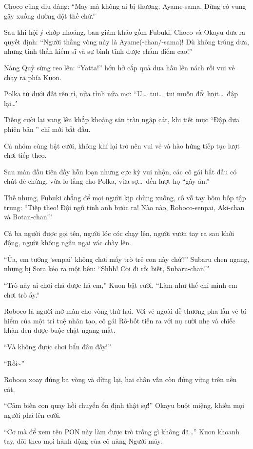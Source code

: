\documentclass[../main.tex]{subfiles}
\begin{document}
Choco cũng dịu dàng: ``May mà không ai bị thương, Ayame-sama. Đừng có vung gậy xuống đường đột thế chứ.''

Sau khi hội ý chớp nhoáng, ban giám khảo gồm Fubuki, Choco và Okayu đưa ra quyết định:
``Người thắng vòng này là Ayame(-chan/-sama)! Dù không trúng dưa, nhưng tinh thần kiếm sĩ và sự bình tĩnh được chấm điểm cao!''

Nàng Quỷ sừng reo lên: ``Yatta!'' hớn hở cắp quả dưa hấu lên nách rồi vui vẻ chạy ra phía Kuon.

Polka từ dưới đất rên rỉ, nửa tỉnh nửa mơ: ``U\dots\ tui\dots\ tui muốn đổi lượt\dots\ đập lại\dots\''

Tiếng cười lại vang lên khắp khoảng sân tràn ngập cát, khi tiết mục ``Đập dưa phiên bản \hll'' chỉ mới bắt đầu.

Cả nhóm cùng bật cười, không khí lại trở nên vui vẻ và hào hứng tiếp tục lượt chơi tiếp theo.

Sau màn đầu tiên đầy hỗn loạn nhưng cực kỳ vui nhộn, các cô gái bắt đầu có chút dè chừng, vừa lo lắng cho Polka, vừa sợ\dots\ đến lượt họ ``gây án.''

Thế nhưng, Fubuki chẳng để mọi người kịp chùng xuống, cô vỗ tay bôm bốp tập trung: ``Tiếp theo! Đội ngũ tinh anh bước ra! Nào nào, Roboco-senpai, Aki-chan và Botan-chan!''

Cả ba người được gọi tên, người lóc cóc chạy lên, người vươn tay ra sau khởi động, người không ngần ngại vác chày lên.

``Ủa, em tưởng `senpai' không chơi mấy trò trẻ con này chứ?'' Subaru chen ngang, nhưng bị Sora kéo ra một bên: ``Shhh! Coi đi rồi biết, Subaru-chan!''

``Trò này ai chơi chả được hả em,'' Kuon bật cười. ``Làm như thể chỉ mình em chơi trò ấy.''

\ct

Roboco là người mở màn cho vòng thứ hai. Với vẻ ngoài dễ thương pha lẫn vẻ bí hiểm của một trí tuệ nhân tạo, cô gái Rô-bốt tiến ra với nụ cười nhẹ và chiếc khăn đen được buộc chặt ngang mắt.

``Và không được chơi bẩn đâu đấy!''

``Rồi\~{}''

Roboco xoay đúng ba vòng và dừng lại, hai chân vẫn còn đứng vững trên nền cát.

``Cảm biến con quay hồi chuyển ổn định thật sự!'' Okayu buột miệng, khiến mọi người phá lên cười.

``Cơ mà để xem tên PON này làm được trò trống gì không đã\dots'' Kuon khoanh tay, dõi theo mọi hành động của cô nàng Người máy.
\end{document}
